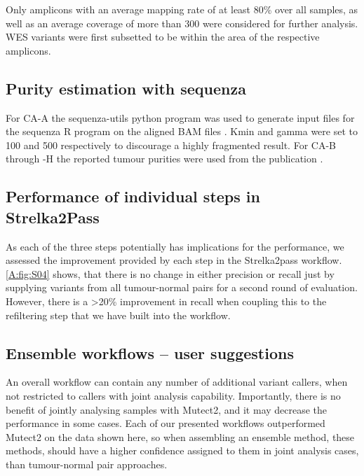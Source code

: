 Only amplicons with an average mapping rate of at least 80\% over all samples, as well as an average coverage of more than 300 were considered for further analysis. WES variants were first subsetted to be within the area of the respective amplicons.

\subsection{Purity estimation with sequenza}
For CA-A the sequenza-utils python program was used to generate input files for the sequenza R program on the aligned BAM files \cite{Favero2015}. Kmin and gamma were set to 100 and 500 respectively to discourage a highly fragmented result.  For CA-B through -H the reported tumour purities were used from the publication \cite{Vergara2021}.

\subsection{Performance of individual steps in Strelka2Pass}
\label{A:varcalling:steps}
As each of the three steps potentially has implications for the performance, we assessed the improvement provided by each step in the Strelka2pass workflow. \autoref{A:fig:S04} shows, that there is no change in either precision or recall just by supplying variants from all tumour-normal pairs for a second round of evaluation. However, there is a >20\% improvement in recall when coupling this to the refiltering step that we have built into the workflow. 

\subsection{Ensemble workflows – user suggestions}
An overall workflow can contain any number of additional variant callers, when not restricted to callers with joint analysis capability. Importantly, there is no benefit of jointly analysing samples with Mutect2, and it may decrease the performance in some cases. Each of our presented workflows outperformed Mutect2 on the data shown here, so when assembling an ensemble method, these methods, should have a higher confidence assigned to them in joint analysis cases, than tumour-normal pair approaches.

